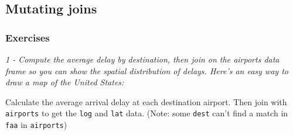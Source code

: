 \documentclass[]{article}
\newenvironment{Shaded}{\begin{snugshade}}{\end{snugshade}}
\newcommand{\KeywordTok}[1]{\textcolor[rgb]{0.13,0.29,0.53}{\textbf{#1}}}
\newcommand{\DataTypeTok}[1]{\textcolor[rgb]{0.13,0.29,0.53}{#1}}
\newcommand{\StringTok}[1]{\textcolor[rgb]{0.31,0.60,0.02}{#1}}
\newcommand{\OtherTok}[1]{\textcolor[rgb]{0.56,0.35,0.01}{#1}}
\newcommand{\OperatorTok}[1]{\textcolor[rgb]{0.81,0.36,0.00}{\textbf{#1}}}
\newcommand{\NormalTok}[1]{#1}
\theoremstyle{definition}
\theoremstyle{definition}
\theoremstyle{definition}
\theoremstyle{remark}
\begin{document}
\subsection{Mutating joins}\label{mutating-joins}

\subsubsection{Exercises}\label{exercises-28}

\emph{1 - Compute the average delay by destination, then join on the
airports data frame so you can show the spatial distribution of delays.
Here's an easy way to draw a map of the United States:}

\begin{Shaded}
\end{Shaded}

Calculate the average arrival delay at each destination airport. Then
join with \texttt{airports} to get the \texttt{log} and \texttt{lat}
data. (Note: some \texttt{dest} can't find a match in \texttt{faa} in
\texttt{airports})

\begin{Shaded}
\end{Shaded}
\end{document}
